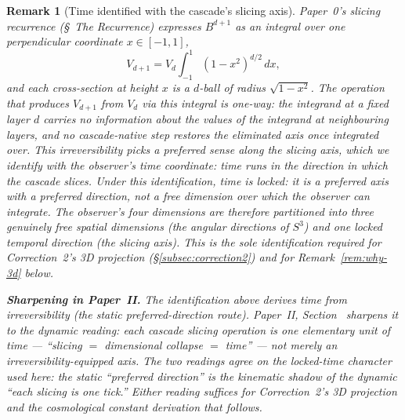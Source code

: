 \documentclass[11pt,a4paper]{article}
\newtheorem{remark}[theorem]{Remark}
\begin{document}
\begin{remark}[Time identified with the cascade's slicing axis]\label{rem:time-slicing}
Paper~0's slicing recurrence (\S~The Recurrence) expresses $B^{d+1}$
as an integral over one perpendicular coordinate $x\in[-1,1]$,
\[
V_{d+1} = V_d\int_{-1}^{1}(1-x^2)^{d/2}\,dx,
\]
and each cross-section at height $x$ is a $d$-ball of radius
$\sqrt{1-x^2}$. The operation that produces $V_{d+1}$ from $V_d$ via
this integral is one-way: the integrand at a fixed layer $d$ carries
no information about the values of the integrand at neighbouring
layers, and no cascade-native step restores the eliminated axis once
integrated over. This irreversibility picks a preferred sense along
the slicing axis, which we identify with the observer's time
coordinate: time runs in the direction in which the cascade slices.
Under this identification, time is \emph{locked}: it is a preferred
axis with a preferred direction, not a free dimension over which the
observer can integrate. The observer's four dimensions are therefore
partitioned into three genuinely free spatial dimensions (the
angular directions of $S^3$) and one locked temporal direction (the
slicing axis). This is the sole identification required for Correction~2's 3D
projection (\S\ref{subsec:correction2}) and for
Remark~\ref{rem:why-3d} below.

\medskip\noindent\textbf{Sharpening in Paper~II.} The identification
above derives time from \emph{irreversibility} (the static
preferred-direction route). Paper~II, Section~ sharpens it to the
\emph{dynamic} reading: each cascade slicing operation \emph{is} one
elementary unit of time --- ``slicing $=$ dimensional collapse $=$
time'' --- not merely an irreversibility-equipped axis. The two
readings agree on the locked-time character used here: the static
``preferred direction'' is the kinematic shadow of the dynamic
``each slicing is one tick.'' Either reading suffices for
Correction~2's 3D projection and the cosmological constant
derivation that follows.
\end{remark}
\end{document}
